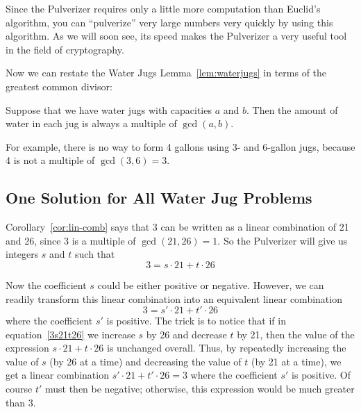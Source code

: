 Since the Pulverizer requires only a little more computation than Euclid's algorithm, you
can ``pulverize'' very large numbers very quickly by using this algorithm.  As we will soon
see, its speed makes the Pulverizer a very useful tool in the field of cryptography.

Now we can restate the Water Jugs Lemma~\ref{lem:waterjugs} in terms of the greatest common
divisor:
\begin{corollary}\label{cor:waterjugs}
Suppose that we have water jugs with capacities $a$ and $b$.  Then the amount of water in
each jug is always a multiple of $\gcd(a, b)$.
\end{corollary}
For example, there is no way to form 4 gallons using 3- and 6-gallon jugs, because 4 is not
a multiple of $\gcd(3, 6) = 3$.

\subsection{One Solution for All Water Jug Problems}\label{all_jugs_son_sec}

Corollary~\ref{cor:lin-comb} says that 3 can be written as a linear
combination of 21 and 26, since 3 is a multiple of $\gcd(21, 26) = 1$.
So the Pulverizer will give us integers $s$ and $t$ such that
\begin{equation}\label{3s21t26}
3 = s \cdot 21 + t \cdot 26
\end{equation}

Now the coefficient $s$ could be either positive or negative.
However, we can readily transform this linear combination into an
equivalent linear combination
\begin{equation}\label{3sprime21}
3 = s' \cdot 21 + t' \cdot 26
\end{equation}
where the coefficient $s'$ is positive.  The trick is to notice that
if in equation~\eqref{3s21t26} we increase $s$ by 26 and decrease $t$
by 21, then the value of the expression $s \cdot 21 + t \cdot 26$ is
unchanged overall.  Thus, by repeatedly increasing the value of $s$
(by 26 at a time) and decreasing the value of $t$ (by 21 at a time),
we get a linear combination $s' \cdot 21 + t' \cdot 26 = 3$ where the
coefficient $s'$ is positive.  Of course $t'$ must then be negative;
otherwise, this expression would be much greater than 3.

